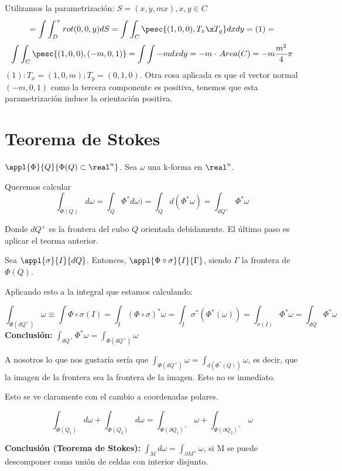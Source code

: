 Utilizamos la parametrización: $S = (x,y,mx), x,y\in C$
\[ = \int\int_D^+ rot(0,0,y)dS = \int \int_C \pesc{(1,0,0) ,T_x\x T_y} dxdy= (1) =\]
\[ \int \int_C \pesc{(1,0,0),(-m,0,1)} = \int\int -m dxdy = -m \cdot \, Area (C) = -m\frac{m^2}{4}\pi \]
$(1): T_x = (1,0,m); T_y = (0,1,0) $. Otra cosa aplicada es que el vector normal $(-m,0,1)$ como la tercera componente es positiva, tenemos que esta parametrización induce la orientación positiva.


\section{Teorema de Stokes}



\label{StokesCeldas}
$\appl{\Phi}{Q}{\Phi(Q)\subset\real^n}$. Sea $\omega$ una k-forma en $\real^n$.

Queremos calcular \[
\int_{\Phi(Q)} d\omega = \int_Q \Phi^{\ast}d\omega) = \int_Q d(\Phi^{\ast}\omega) = \int_{dQ^{+}} \Phi^{\ast}\omega
\]

Donde $dQ^{+}$ es la frontera del cubo $Q$ orientada debidamente. El último paso es aplicar el teorma anterior.

Sea $\appl{\sigma}{I}{dQ}$. Entonces, $\appl{\Phi\circ\sigma}{I}{\Gamma}$, siendo $\Gamma$ la frontera de $\Phi(Q)$.

Aplicando esto a la integral que estamos calculando:

\[
\int_{\Phi(dQ^{+})} \omega \equiv \int{\Phi\circ\sigma(I)} = \int_I (\Phi\circ\sigma)^{\ast} \omega = \int_I \sigma^{\ast}\left(\Phi^{\ast}(\omega)\right) = \int_{\sigma(I)} \Phi^{\ast}\omega = \int_{dQ}\Phi^{\ast}\omega
\]
\textbf{Conclusión:} $\displaystyle \int_{dQ^+} \Phi^{\ast} \omega = \int_{\Phi(dQ^+)} \omega$


A nosotros lo que nos gustaría sería que $\displaystyle\int_{\Phi(dQ^+)} \omega = \int_{d(\Phi^{\ast}(Q))} \omega$, es decir, que la imagen de la frontera sea la frontera de la imagen. Esto no es inmediato.

Esto se ve claramente con el cambio a coordenadas polares.

\[
\int_{\Phi(Q_1)}d\omega + \int_{\Phi(Q_2)}d\omega=
\int_{\Phi(\partial  Q_1)^+}\omega+\int_{\Phi(\partial  Q_2)^+}\omega
\]

\textbf{Conclusión (Teorema de Stokes):} $\displaystyle\int_M d\omega = \int_{\partial  M^+}\omega$, si M se puede descomponer como unión de celdas con interior disjunto. 

